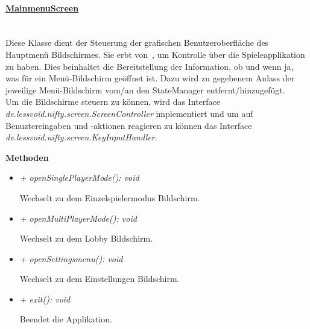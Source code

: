 		\paragraph{\underline{MainmenuScreen}} \mbox{}\\
            Diese Klasse dient der Steuerung der grafischen Benutzeroberfläche
            des Hauptmenü Bildschirmes. Sie erbt von~, um Kontrolle über die 
            Spieleapplikation zu haben. Dies beinhaltet  die Bereitstellung der
            Information, ob und wenn ja, was für ein Menü-Bildschirm geöffnet ist.
            Dazu wird zu gegebenem Anlass der jeweilige Menü-Bildschirm vom/an den
            StateManager entfernt/hinzugefügt.\\
            Um die Bildschirme steuern zu können, wird das Interface
            \textit{de.lessvoid.nifty.screen.ScreenController} implementiert und um auf
            Benuztereingaben und -aktionen reagieren zu können das Interface
            \textit{de.lessvoid.nifty.screen.KeyInputHandler}. \par
                        
            \textbf{Methoden}					
            \begin{itemize}
                \item  \textit{+ openSinglePlayerMode(): void} 
                    \begin{leftbar}[0.9\linewidth]
                        Wechselt zu dem Einzelspielermodus Bildschirm.\\
                    \end{leftbar}
                    \pagebreak
                \item  \textit{+ openMultiPlayerMode(): void} 
                    \begin{leftbar}[0.9\linewidth]
                        Wechselt zu dem Lobby Bildschirm.\\
                    \end{leftbar}
                \item  \textit{+ openSettingsmenu(): void} 
                    \begin{leftbar}[0.9\linewidth]
                        Wechselt zu dem Einstellungen Bildschirm.\\
                    \end{leftbar}
                \item  \textit{+ exit(): void} 
                    \begin{leftbar}[0.9\linewidth]
                        Beendet die Applikation.\\
                    \end{leftbar}
            \end{itemize}
        
